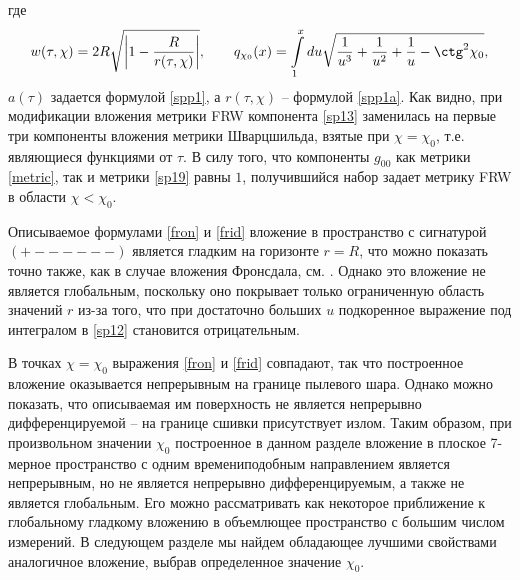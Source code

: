 \documentclass[12pt]{article}
\newcommand{\bq}{\begin{equation}}
\newcommand{\eq}{\end{equation}}
\begin{document}
где
\bq\label{sp12}
w(\tau, \chi)=2 R \sqrt{\left|1-\frac{R}{r(\tau, \chi)}\right|},\qquad
q_{\chi_0}(x) = \int \limits_1^x d u \sqrt{\frac{1}{u^3}+\frac{1}{u^2}+\frac{1}{u}-\ctg^2{\chi_0}},
\eq
$a(\tau)$ задается формулой \eqref{spp1}, а $r(\tau, \chi)$ -- формулой \eqref{spp1a}.
Как видно, при модификации вложения метрики FRW компонента \eqref{sp13} заменилась на первые три компоненты вложения метрики Шварцшильда, взятые при $\chi = \chi_0$, т.е. являющиеся функциями от $\tau$.
В силу того, что  компоненты $g_{00}$
как метрики \eqref{metric}, так и метрики \eqref{sp19} равны
$1$, получившийся набор задает метрику FRW в области $\chi<\chi_0$.

Описываемое формулами \eqref{fron} и \eqref{frid} вложение в пространство с сигнатурой $(+------)$
является гладким на горизонте $r=R$, что можно показать точно также, как в случае вложения Фронсдала,
см. \cite{frons}.
Однако это вложение не является глобальным, поскольку оно покрывает
только ограниченную область значений $r$ из-за того, что при достаточно больших $u$ подкоренное выражение под интегралом в \eqref{sp12} становится отрицательным.

В точках $\chi=\chi_0$ выражения \eqref{fron} и \eqref{frid} совпадают, так что
построенное вложение оказывается непрерывным на границе пылевого шара.
Однако можно показать, что описываемая им поверхность не является непрерывно дифференцируемой -- на границе сшивки присутствует
излом. Таким образом, при произвольном значении $\chi_0$ построенное в данном разделе вложение в плоское 7-мерное пространство
с одним времениподобным направлением является непрерывным, но не является непрерывно дифференцируемым, а также не является глобальным.
Его можно рассматривать как некоторое приближение к глобальному гладкому вложению в объемлющее пространство с большим числом измерений.
В следующем разделе мы найдем обладающее лучшими свойствами аналогичное вложение, выбрав определенное значение $\chi_0$.
\end{document}
